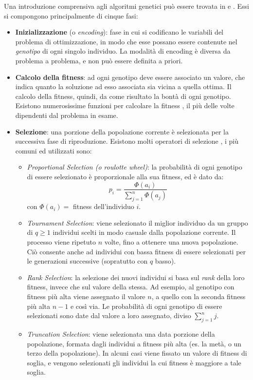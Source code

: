 \documentclass[a4paper,12pt]{article}
\begin{document}
Una introduzione comprensiva agli algoritmi genetici può essere trovata in \cite{introGA} e \cite{understandingInt}. Essi si compongono principalmente di cinque fasi: 
\begin{itemize}
	\item \textbf{Inizializzazione} (o \emph{encoding}): fase in cui si codificano le variabili del problema di ottimizzazione, in modo che esse possano essere contenute nel \emph{genotipo} di ogni singolo individuo. La modalità di encoding è diversa da problema a problema, e non può essere definita a priori. 
	\item \textbf{Calcolo della fitness}: ad ogni genotipo deve essere associato un valore, che indica quanto la soluzione ad esso associata sia vicina a quella ottima. Il calcolo della fitness, quindi, da come risultato la bontà di ogni genotipo. Esistono numerosissime funzioni per calcolare la fitness \cite{fitnessSurvey}, il più delle volte dipendenti dal problema in esame.
	\item \textbf{Selezione}: una porzione della popolazione corrente è selezionata per la successiva fase di riproduzione. Esistono molti operatori di selezione \cite{SelectionSurvey}, i più comuni ed utilizzati sono: 
	\begin{itemize}
		\item \emph{Proportional Selection (o roulotte wheel)}: la probabilità di ogni genotipo di essere selezionato è proporzionale alla sua fitness, ed è dato da: 
		\begin{equation}
			p_i = \frac{\Phi(a_i)}{\sum_{j = 1}^{n}\Phi(a_j)}
		\end{equation}
		con $\Phi(a_i) = $ fitness dell'individuo $i$.
		\item \emph{Tournament Selection}: viene selezionato il miglior individuo da un gruppo di $q \ge 1$ individui scelti in modo casuale dalla popolazione corrente. Il processo viene ripetuto $n$ volte, fino a ottenere una nuova popolazione. Ciò consente anche ad individui con bassa fitness di essere selezionati per le generazioni successive (sopratutto con $q$ basso).
		\item \emph{Rank Selection}: la selezione dei nuovi individui si basa sul \emph{rank} della loro fitness, invece che sul valore della stessa. Ad esempio, al genotipo con fitness più alta viene assegnato il valore $n$, a quello con la seconda fitness più alta $n-1$ e così via. Le probabilità di ogni genotipo di essere selezionati sono date dal valore a loro assegnato, diviso $\sum_{j = 1}^{n}j$.
		\item \emph{Truncation Selection}: viene selezionata una data porzione della popolazione, formata dagli individui a fitness più alta (es. la metà, o un terzo della popolazione). In alcuni casi viene fissato un valore di fitness di soglia, e vengono selezionati gli individui la cui fitness è maggiore a tale soglia. 

\end{itemize}
\end{itemize}
\end{document}
